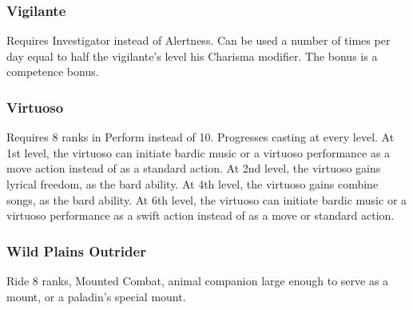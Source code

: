 \subsubsection{Vigilante}
 Requires Investigator instead of Alertness.
 Can be used a number of times per day equal to half the vigilante's level \add his Charisma modifier.
 The bonus is a competence bonus.
\subsubsection{Virtuoso}
 Requires 8 ranks in Perform instead of 10.
 Progresses casting at every level.
 At 1st level, the virtuoso can initiate bardic music or a virtuoso performance as a move action instead of as a standard action.
 At 2nd level, the virtuoso gains lyrical freedom, as the bard ability.
 At 4th level, the virtuoso gains combine songs, as the bard ability.
 At 6th level, the virtuoso can initiate bardic music or a virtuoso performance as a swift action instead of as a move or standard action.
\subsubsection{Wild Plains Outrider}
 Ride 8 ranks, Mounted Combat, animal companion large enough to serve as a mount, or a paladin's special mount.

